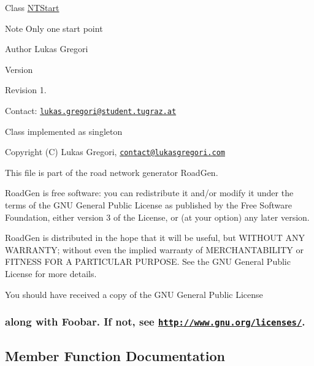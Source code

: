 Class \hyperlink{class_n_t_start}{N\+T\+Start}

\begin{DoxyNote}{Note}
Only one start point
\end{DoxyNote}
\begin{DoxyAuthor}{Author}
Lukas Gregori 
\end{DoxyAuthor}
\begin{DoxyVersion}{Version}

\end{DoxyVersion}
\begin{DoxyParagraph}{Revision}
1. 
\end{DoxyParagraph}


Contact\+: \href{mailto:lukas.gregori@student.tugraz.at}{\tt lukas.\+gregori@student.\+tugraz.\+at}

Class implemented as singleton



 Copyright (C) Lukas Gregori, \href{mailto:contact@lukasgregori.com}{\tt contact@lukasgregori.\+com}

This file is part of the road network generator Road\+Gen.

Road\+Gen is free software\+: you can redistribute it and/or modify it under the terms of the G\+NU General Public License as published by the Free Software Foundation, either version 3 of the License, or (at your option) any later version.

Road\+Gen is distributed in the hope that it will be useful, but W\+I\+T\+H\+O\+UT A\+NY W\+A\+R\+R\+A\+N\+TY; without even the implied warranty of M\+E\+R\+C\+H\+A\+N\+T\+A\+B\+I\+L\+I\+TY or F\+I\+T\+N\+E\+SS F\+OR A P\+A\+R\+T\+I\+C\+U\+L\+AR P\+U\+R\+P\+O\+SE. See the G\+NU General Public License for more details.

You should have received a copy of the G\+NU General Public License \subsubsection*{along with Foobar. If not, see \href{http://www.gnu.org/licenses/}{\tt http\+://www.\+gnu.\+org/licenses/}. }

\subsection{Member Function Documentation}
\hypertarget{class_n_t_start_a3f9897b293a26b301415a9089b90697b}{}\label{class_n_t_start_a3f9897b293a26b301415a9089b90697b} 
